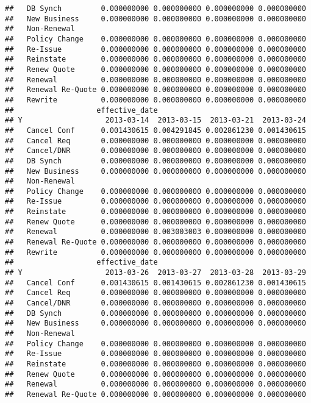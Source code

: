 \documentclass[]{article}
\begin{document}
\begin{verbatim}
##   DB Synch         0.000000000 0.000000000 0.000000000 0.000000000
##   New Business     0.000000000 0.000000000 0.000000000 0.000000000
##   Non-Renewal                                                     
##   Policy Change    0.000000000 0.000000000 0.000000000 0.000000000
##   Re-Issue         0.000000000 0.000000000 0.000000000 0.000000000
##   Reinstate        0.000000000 0.000000000 0.000000000 0.000000000
##   Renew Quote      0.000000000 0.000000000 0.000000000 0.000000000
##   Renewal          0.000000000 0.000000000 0.000000000 0.000000000
##   Renewal Re-Quote 0.000000000 0.000000000 0.000000000 0.000000000
##   Rewrite          0.000000000 0.000000000 0.000000000 0.000000000
##                   effective_date
## Y                   2013-03-14  2013-03-15  2013-03-21  2013-03-24
##   Cancel Conf      0.001430615 0.004291845 0.002861230 0.001430615
##   Cancel Req       0.000000000 0.000000000 0.000000000 0.000000000
##   Cancel/DNR       0.000000000 0.000000000 0.000000000 0.000000000
##   DB Synch         0.000000000 0.000000000 0.000000000 0.000000000
##   New Business     0.000000000 0.000000000 0.000000000 0.000000000
##   Non-Renewal                                                     
##   Policy Change    0.000000000 0.000000000 0.000000000 0.000000000
##   Re-Issue         0.000000000 0.000000000 0.000000000 0.000000000
##   Reinstate        0.000000000 0.000000000 0.000000000 0.000000000
##   Renew Quote      0.000000000 0.000000000 0.000000000 0.000000000
##   Renewal          0.000000000 0.003003003 0.000000000 0.000000000
##   Renewal Re-Quote 0.000000000 0.000000000 0.000000000 0.000000000
##   Rewrite          0.000000000 0.000000000 0.000000000 0.000000000
##                   effective_date
## Y                   2013-03-26  2013-03-27  2013-03-28  2013-03-29
##   Cancel Conf      0.001430615 0.001430615 0.002861230 0.001430615
##   Cancel Req       0.000000000 0.000000000 0.000000000 0.000000000
##   Cancel/DNR       0.000000000 0.000000000 0.000000000 0.000000000
##   DB Synch         0.000000000 0.000000000 0.000000000 0.000000000
##   New Business     0.000000000 0.000000000 0.000000000 0.000000000
##   Non-Renewal                                                     
##   Policy Change    0.000000000 0.000000000 0.000000000 0.000000000
##   Re-Issue         0.000000000 0.000000000 0.000000000 0.000000000
##   Reinstate        0.000000000 0.000000000 0.000000000 0.000000000
##   Renew Quote      0.000000000 0.000000000 0.000000000 0.000000000
##   Renewal          0.000000000 0.000000000 0.000000000 0.000000000
##   Renewal Re-Quote 0.000000000 0.000000000 0.000000000 0.000000000

\end{verbatim}
\end{document}
